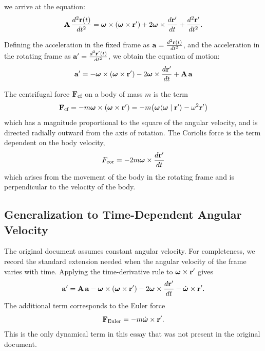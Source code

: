 \documentclass[12pt]{article}
\newcommand{\ip}[2]{\langle #1 \mid #2 \rangle}
\begin{document}
we arrive at the equation:
\begin{equation}
  \vb{A}\,\frac{d^2\vb{r}(t)}{dt^2} =
    \boldsymbol{\omega}\times(\boldsymbol{\omega}\times\vb{r}')
    + 2\boldsymbol{\omega}\times\frac{d\vb{r}'}{dt}
    + \frac{d^2\vb{r}'}{dt^2}.
\end{equation}

Defining the acceleration in the fixed frame as $\vb{a} = \frac{d^2\vb{r}(t)}{dt^2}$, and
the acceleration in the rotating frame as $\vb{a}' = \frac{d^2\vb{r}'(t)}{dt^2}$, we obtain
the equation of motion:
\begin{equation}
  \vb{a}' = -\boldsymbol{\omega}\times(\boldsymbol{\omega}\times\vb{r}')
    - 2\boldsymbol{\omega}\times\frac{d\vb{r}'}{dt}
    + \vb{A}\,\vb{a}
  \label{rotating-frames:acceleration-transformation}
\end{equation}

The centrifugal force $\vb{F}_\text{cf}$ on a body of mass $m$ is the term
\begin{equation}
  \vb{F}_\text{cf} = -m\boldsymbol{\omega}\times(\boldsymbol{\omega}\times\vb{r}')
    = -m\bigl(\boldsymbol{\omega}\ip{\boldsymbol{\omega}}{\vb{r}'} - \omega^2\vb{r}'\bigr)
  \label{rotating-frames:centrifugal-force}
\end{equation}
which has a magnitude proportional to the square of the angular velocity, and is directed
radially outward from the axis of rotation. The Coriolis force is the term dependent on the
body velocity,
\begin{equation}
  F_\text{cor} = -2m\boldsymbol{\omega}\times\frac{d\vb{r}'}{dt}
  \label{rotating-frames:coriolis-force}
\end{equation}
which arises from the movement of the body in the rotating frame and is perpendicular to the
velocity of the body.

\subsection{Generalization to Time-Dependent Angular Velocity}

The original document assumes constant angular velocity. For completeness, we record the
standard extension needed when the angular velocity of the frame varies with time. Applying
the time-derivative rule to $\boldsymbol{\omega}\times\vb{r}'$ gives
\begin{equation}
  \vb{a}' = \vb{A}\,\vb{a}
    - \boldsymbol{\omega}\times(\boldsymbol{\omega}\times\vb{r}')
    - 2\boldsymbol{\omega}\times\frac{d\vb{r}'}{dt}
    - \dot{\boldsymbol{\omega}}\times\vb{r}'.
  \label{rotating-frames:variable-angular-velocity-acceleration}
\end{equation}
The additional term corresponds to the Euler force
\begin{equation}
  \vb{F}_\text{Euler}
    = -m\dot{\boldsymbol{\omega}}\times\vb{r}'.
  \label{rotating-frames:euler-force}
\end{equation}
This is the only dynamical term in this essay that was not present in the original document.
\end{document}
